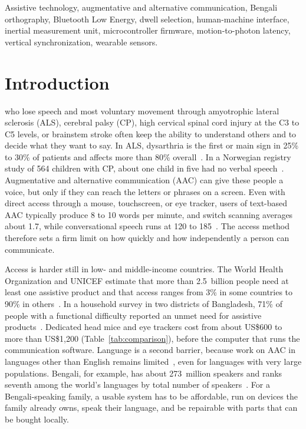 \documentclass[journal]{IEEEtran}
\begin{document}
\begin{IEEEkeywords}
Assistive technology, augmentative and alternative communication, Bengali orthography, Bluetooth Low Energy, dwell selection, human-machine interface, inertial measurement unit, microcontroller firmware, motion-to-photon latency, vertical synchronization, wearable sensors.
\end{IEEEkeywords}

\section{Introduction}
\label{sec:intro}

 who lose speech and most voluntary movement through amyotrophic lateral sclerosis (ALS), cerebral palsy (CP), high cervical spinal cord injury at the C3 to C5 levels, or brainstem stroke often keep the ability to understand others and to decide what they want to say. In ALS, dysarthria is the first or main sign in 25\% to 30\% of patients and affects more than 80\% overall~\cite{tomik2010}. In a Norwegian registry study of 564 children with CP, about one child in five had no verbal speech~\cite{andersen2010}. Augmentative and alternative communication (AAC) can give these people a voice, but only if they can reach the letters or phrases on a screen. Even with direct access through a mouse, touchscreen, or eye tracker, users of text-based AAC typically produce 8 to 10 words per minute, and switch scanning averages about 1.7, while conversational speech runs at 120 to 185~\cite{waller2025}. The access method therefore sets a firm limit on how quickly and how independently a person can communicate.

Access is harder still in low- and middle-income countries. The World Health Organization and UNICEF estimate that more than 2.5~billion people need at least one assistive product and that access ranges from 3\% in some countries to 90\% in others~\cite{who2022}. In a household survey in two districts of Bangladesh, 71\% of people with a functional difficulty reported an unmet need for assistive products~\cite{pryor2018}. Dedicated head mice and eye trackers cost from about US\$600 to more than US\$1,200 (Table~\ref{tab:comparison}), before the computer that runs the communication software. Language is a second barrier, because work on AAC in languages other than English remains limited~\cite{amery2022}, even for languages with very large populations. Bengali, for example, has about 273~million speakers and ranks seventh among the world's languages by total number of speakers~\cite{britannica}. For a Bengali-speaking family, a usable system has to be affordable, run on devices the family already owns, speak their language, and be repairable with parts that can be bought locally.
\end{document}
